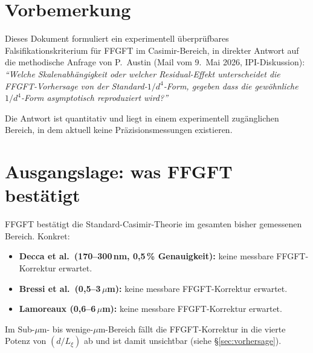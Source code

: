 
\section*{Vorbemerkung}

Dieses Dokument formuliert ein experimentell überprüfbares
Falsifikationskriterium für FFGFT im Casimir-Bereich, in direkter
Antwort auf die methodische Anfrage von P.~Austin (Mail vom 9.~Mai
2026, IPI-Diskussion): \emph{\enquote{Welche Skalenabhängigkeit
oder welcher Residual-Effekt unterscheidet die FFGFT-Vorhersage von
der Standard-$1/d^4$-Form, gegeben dass die gewöhnliche $1/d^4$-Form
asymptotisch reproduziert wird?}}

Die Antwort ist quantitativ und liegt in einem experimentell
zugänglichen Bereich, in dem aktuell keine Präzisionsmessungen
existieren.

\section{Ausgangslage: was FFGFT bestätigt}

FFGFT bestätigt die Standard-Casimir-Theorie im gesamten bisher
gemessenen Bereich. Konkret:

\begin{itemize}[leftmargin=2em,itemsep=2pt,topsep=2pt]
  \item \textbf{Decca et al.\ (170--300\,nm, 0{,}5\,\% Genauigkeit):}
        keine messbare FFGFT-Korrektur erwartet.
  \item \textbf{Bressi et al.\ (0{,}5--3\,$\mu$m):} keine messbare
        FFGFT-Korrektur erwartet.
  \item \textbf{Lamoreaux (0{,}6--6\,$\mu$m):} keine messbare
        FFGFT-Korrektur erwartet.
\end{itemize}

Im Sub-$\mu$m- bis wenige-$\mu$m-Bereich fällt die FFGFT-Korrektur in
die vierte Potenz von $(d/L_\xi)$ ab und ist damit unsichtbar (siehe
§\ref{sec:vorhersage}).

